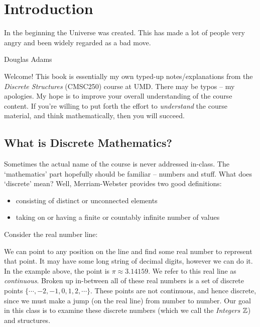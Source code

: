 \documentclass[main.tex]{subfiles}
\begin{document}
\chapter{Introduction}

\epigraph{In the beginning the Universe was created. This has made a lot of people very angry and been widely regarded as a bad move.}{Douglas Adams}

Welcome! This book is essentially my own typed-up notes/explanations from the \textit{Discrete Structures} (CMSC250) course at UMD. There may be typos -- my apologies. My hope is to improve your overall understanding of the course content. If you're willing to put forth the effort to \textit{understand} the course material, and think mathematically, then you will succeed.

\section{What is Discrete Mathematics?}

Sometimes the actual name of the course is never addressed in-class. The `mathematics' part hopefully should be familiar -- numbers and stuff. What does `discrete' mean? Well, Merriam-Webster provides two good definitions:

\begin{defn}
	\leavevmode
	\begin{itemize}
		\item consisting of distinct or unconnected elements
		\item taking on or having a finite or countably infinite number of values \cite{discrete-defn}
	\end{itemize}
\end{defn}

Consider the real number line:

\begin{center}
\end{center}

We can point to any position on the line and find some real number to represent that point. It may have some long string of decimal digits, however we can do it. In the example above, the point is \(\pi \approx 3.14159\). We refer to this real line as \textit{continuous}. Broken up in-between all of these real numbers is a set of discrete points \(\{\cdots,-2,-1,0,1,2,\cdots\}\). These points are not continuous, and hence discrete, since we must make a jump (on the real line) from number to number. Our goal in this class is to examine these discrete numbers (which we call the \textit{Integers} \(\mathbb{Z}\)) and structures.
\end{document}

